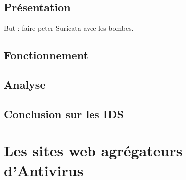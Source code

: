 \documentclass[smallextended]{svjour3}       %
\begin{document}
\subsection{Présentation}
\label{ids:présentation}
But : faire peter Suricata avec les bombes.

\subsection{Fonctionnement}
\label{ids:fonctionnement}

\subsection{Analyse}
\label{ids:analyse}

\subsection{Conclusion sur les IDS}
\label{ids:conclusion}

\newpage
\section{Les sites web agrégateurs d'Antivirus}
\label{sec2:agrégateurs}

\end{document}
